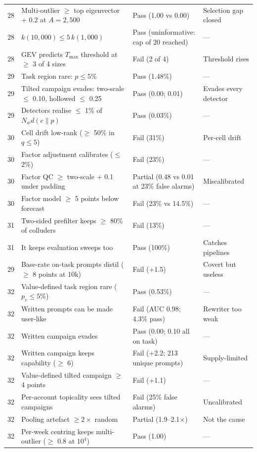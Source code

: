 \begin{longtable}{p{}p{}p{}p{}}
28 & Multi-outlier $\ge$ top eigenvector + 0.2 at $A=2{,}500$ & Pass (1.00 vs 0.00) & Selection gap closed \\
28 & $k(10{,}000)\le 5\,k(1{,}000)$ & Pass (uninformative: cap of 20 reached) & --- \\
28 & GEV predicts $T_{\max}$ threshold at $\ge$ 3 of 4 sizes & Fail (2 of 4) & Threshold rises \\
29 & Task region rare: $p\le 5\%$ & Pass (1.48\%) & --- \\
29 & Tilted campaign evades: two-scale $\le$ 0.10, hollowed $\le$ 0.25 & Pass (0.00; 0.01) & Evades every detector \\
29 & Detectors realise $\le$ 1\% of $N_w d(c\|p)$ & Pass (0.03\%) & --- \\
30 & Cell drift low-rank ($\ge$ 50\% in $q\le 5$) & Fail (31\%) & Per-cell drift \\
30 & Factor adjustment calibrates ($\le$ 2\%) & Fail (23\%) & --- \\
30 & Factor QC $\ge$ two-scale + 0.1 under padding & Partial (0.48 vs 0.01 at 23\% false alarms) & Miscalibrated \\
30 & Factor model $\ge$ 5 points below forecast & Fail (23\% vs 14.5\%) & --- \\
31 & Two-sided prefilter keeps $\ge$ 80\% of colluders & Fail (13\%) & --- \\
31 & It keeps evaluation sweeps too & Pass (100\%) & Catches pipelines \\
29 & Base-rate on-task prompts distil ($\ge$ 8 points at 10k) & Fail (+1.5) & Covert but useless \\
32 & Value-defined task region rare ($p_v\le 5\%$) & Pass (0.53\%) & --- \\
32 & Written prompts can be made user-like & Fail (AUC 0.98; 4.3\% pass) & Rewriter too weak \\
32 & Written campaign evades & Pass (0.00; 0.10 all on task) & --- \\
32 & Written campaign keeps capability ($\ge$ 6) & Fail (+2.2; 213 unique prompts) & Supply-limited \\
32 & Value-defined tilted campaign $\ge$ 4 points & Fail (+1.1) & --- \\
32 & Per-account topicality sees tilted campaigns & Fail (25\% false alarms) & Uncalibrated \\
32 & Pooling artefact $\ge 2\times$ random & Partial (1.9--2.1$\times$) & Not the cause \\
32 & Per-week centring keeps multi-outlier ($\ge$ 0.8 at $10^4$) & Pass (1.00) & --- \\

\end{longtable}
